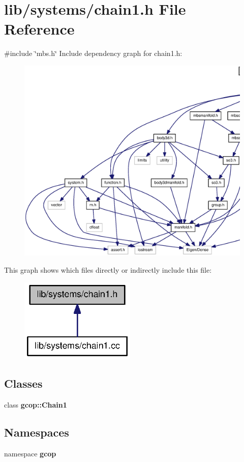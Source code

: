 \section{lib/systems/chain1.h \-File \-Reference}
\label{chain1_8h}
{\ttfamily \#include \char`\"{}mbs.\-h\char`\"{}}\*
\-Include dependency graph for chain1.\-h\-:\nopagebreak
\begin{figure}[H]
\begin{center}
\leavevmode
\includegraphics[width=350pt]{chain1_8h__incl}
\end{center}
\end{figure}
\-This graph shows which files directly or indirectly include this file\-:\nopagebreak
\begin{figure}[H]
\begin{center}
\leavevmode
\includegraphics[width=156pt]{chain1_8h__dep__incl}
\end{center}
\end{figure}
\subsection*{\-Classes}
\begin{DoxyCompactItemize}
\item 
class {\bf gcop\-::\-Chain1}
\end{DoxyCompactItemize}
\subsection*{\-Namespaces}
\begin{DoxyCompactItemize}
\item 
namespace {\bf gcop}
\end{DoxyCompactItemize}
